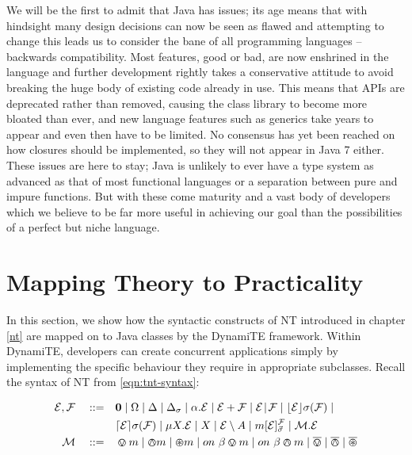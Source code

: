 We will be the first to admit that Java has issues; its age means that
with hindsight many design decisions can now be seen as flawed and
attempting to change this leads us to consider the bane of all
programming languages -- backwards compatibility.  Most features, good
or bad, are now enshrined in the language and further development
rightly takes a conservative attitude to avoid breaking the huge body
of existing code already in use.  This means that APIs are deprecated
rather than removed, causing the class library to become more bloated
than ever, and new language features such as generics take years to
appear and even then have to be limited.  No consensus has yet been
reached on how closures should be implemented, so they will not appear
in Java 7 either.  These issues are here to stay; Java is unlikely to
ever have a type system as advanced as that of most functional
languages or a separation between pure and impure functions.  But with
these come maturity and a vast body of developers which we believe to
be far more useful in achieving our goal than the possibilities of a
perfect but niche language.

\section{Mapping Theory to Practicality}
\label{dyn:maptheory}

In this section, we show how the syntactic constructs of NT introduced
in chapter \ref{nt} are mapped on to Java classes by the DynamiTE
framework.  Within DynamiTE, developers can create concurrent
applications simply by implementing the specific behaviour they
require in appropriate subclasses.  Recall the syntax of NT from
\ref{eqn:tnt-syntax}:

\begin{equation}
  \begin{aligned}
    \text{$\mathcal{E}$}, \text{$\mathcal{F}$} \quad \mathrel{::=} \quad &
      \textbf{0}  \mid
      \Omega \mid
      \Delta \mid
      \Delta_{\sigma} \mid
      \alpha . \text{$\mathcal{E}$}  \mid
      \text{$\mathcal{E}$} + \text{$\mathcal{F}$} \mid
      \text{$\mathcal{E}$} \mathrel{\!|\!} \text{$\mathcal{F}$} \mid
      \lfloor{\text{$\mathcal{E}$}}\rfloor {\sigma} ({\text{$\mathcal{F}$}}) \mid \\
    & \lceil{\text{$\mathcal{E}$}}\rceil {\sigma} ({\text{$\mathcal{F}$}}) \mid 
      \mu X . \text{$\mathcal{E}$} \mid
      X \mid 
      \text{$\mathcal{E}$} \setminus {A} \mid
      {m}[ \text{$\mathcal{E}$} ]^{\text{$\mathcal{F}$}}_{\vec{\sigma}} \mid
      \text{$\mathcal{M}$} . \text{$\mathcal{E}$} \\
   \text{$\mathcal{M}$} \quad \mathrel{::=} \quad & \varovee m \mid \varowedge m \mid \varoast m \mid
      on\ \beta \varovee m \mid on\ \beta \varowedge m \mid \overline{\varovee} \mid
      \overline{\varowedge} \mid \overline{\varoast}
   \end{aligned}
\end{equation}

